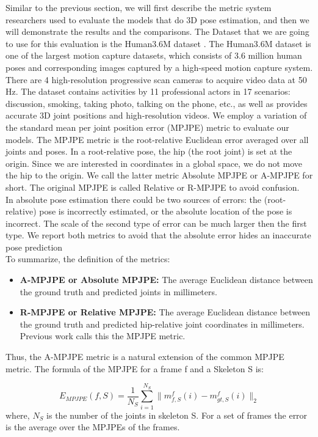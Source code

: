 Similar to the previous section, we will first describe the metric system researchers used to evaluate the models that do 3D pose estimation, and then we will demonstrate the results and the comparisons. The Dataset that we are going to use for this evaluation is the Human3.6M dataset \cite{Human3.6M}. The Human3.6M dataset is one of the largest motion capture datasets, which consists of 3.6 million human poses and corresponding images captured by a high-speed motion capture system. There are 4 high-resolution progressive scan cameras to acquire video data at 50 Hz. The dataset contains activities by 11 professional actors in 17 scenarios: discussion, smoking, taking photo, talking on the phone, etc., as well as provides accurate 3D joint positions and high-resolution videos. We employ a variation of the standard mean per joint position error (MPJPE) metric to evaluate our models. The MPJPE metric is the root-relative Euclidean error averaged over all joints and poses. In a root-relative pose, the hip (the root joint) is set at the origin. Since we are interested in coordinates in a global space, we do not move the hip to the origin. We call the latter metric Absolute MPJPE or A-MPJPE for short. The original MPJPE is called Relative or R-MPJPE to avoid confusion.\\

In absolute pose estimation there could be two sources of errors: the (root-relative) pose is incorrectly estimated, or the absolute location of the pose is incorrect. The scale of the second type of error can be much larger then the first type. We report both metrics to avoid that the absolute error hides an inaccurate pose prediction\\

To summarize, the definition of the metrics:

\begin{itemize}
  \item \textbf{A-MPJPE or Absolute MPJPE: }  The average Euclidean distance between the ground truth and  predicted joints in millimeters.
  \item \textbf{R-MPJPE or Relative MPJPE: } The average Euclidean distance between the ground truth and predicted hip-relative joint coordinates in millimeters. Previous work calls this the MPJPE metric.
\end{itemize} 
Thus, the A-MPJPE metric is a natural extension of the common MPJPE metric. The formula of the MPJPE for a frame f and a Skeleton S is: 

$$ E_{MPJPE}(f,S) = \dfrac{1}{N_S}\sum^{N_S}_{i=1} \lVert  m_{f,S}^{f}(i) - m_{gt,S}^{f}(i)   \rVert_2 $$
where, $N_S$ is the number of the joints in skeleton S. For a set of frames the error is the average over the MPJPEs of the frames.

